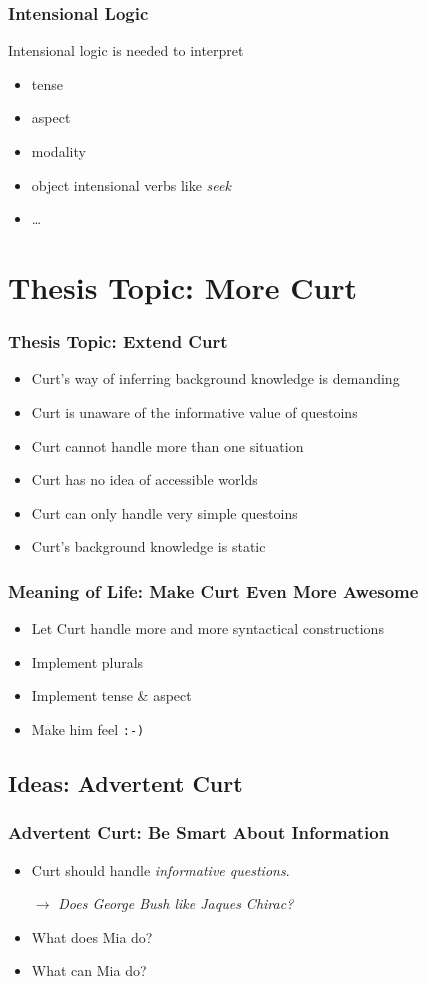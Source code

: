 \documentclass{beamer}
\begin{document}
\begin{frame}
  \frametitle{Intensional Logic}
  Intensional logic is needed to interpret
  \begin{itemize}
    \item tense
    \item aspect
    \item modality
    \item object intensional verbs like \emph{seek}
    \item \ldots
  \end{itemize}
\end{frame}

\section{Thesis Topic: More Curt}
\begin{frame}
  \frametitle{Thesis Topic: Extend Curt}
  \begin{itemize}
    \item Curt's way of inferring background knowledge is demanding
    \item Curt is unaware of the informative value of questoins
    \item Curt cannot handle more than one situation
    \item Curt has no idea of accessible worlds
    \item Curt can only handle very simple questoins
    \item Curt's background knowledge is static
  \end{itemize}
\end{frame}

\begin{frame}
\frametitle{Meaning of Life: Make Curt Even More Awesome}
  \begin{itemize}
    \item Let Curt handle more and more syntactical constructions
    \item Implement plurals
    \item Implement tense \& aspect
    \item Make him feel \texttt{:-)}
  \end{itemize}
\end{frame}

\subsection{Ideas: Advertent Curt}
\begin{frame}
\frametitle{Advertent Curt: Be Smart About Information}
  \begin{itemize}
    \item Curt should handle \emph{informative questions}.
    \item[$\to$] \emph{Does George Bush like Jaques Chirac?}
    \item What does Mia do?
    \item What can Mia do?
  \end{itemize}
\end{frame}
\end{document}
